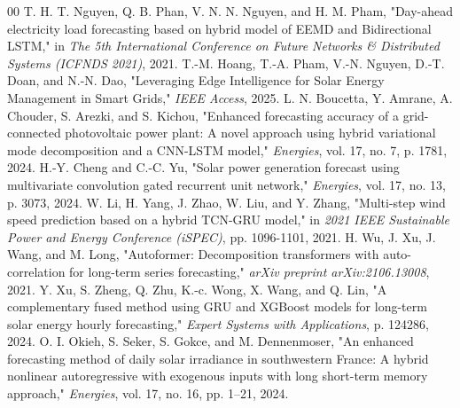 \documentclass[conference]{IEEEtran}
\begin{document}
\begin{thebibliography}{00}
 T. H. T. Nguyen, Q. B. Phan, V. N. N. Nguyen, and H. M. Pham, "Day-ahead electricity load forecasting based on hybrid model of EEMD and Bidirectional LSTM," in \textit{The 5th International Conference on Future Networks \& Distributed Systems (ICFNDS 2021)}, 2021.
 T.-M. Hoang, T.-A. Pham, V.-N. Nguyen, D.-T. Doan, and N.-N. Dao, "Leveraging Edge Intelligence for Solar Energy Management in Smart Grids," \textit{IEEE Access}, 2025.
 L. N. Boucetta, Y. Amrane, A. Chouder, S. Arezki, and S. Kichou, "Enhanced forecasting accuracy of a grid-connected photovoltaic power plant: A novel approach using hybrid variational mode decomposition and a CNN-LSTM model," \textit{Energies}, vol. 17, no. 7, p. 1781, 2024.
 H.-Y. Cheng and C.-C. Yu, "Solar power generation forecast using multivariate convolution gated recurrent unit network," \textit{Energies}, vol. 17, no. 13, p. 3073, 2024.
 W. Li, H. Yang, J. Zhao, W. Liu, and Y. Zhang, "Multi-step wind speed prediction based on a hybrid TCN-GRU model," in \textit{2021 IEEE Sustainable Power and Energy Conference (iSPEC)}, pp. 1096-1101, 2021.
 H. Wu, J. Xu, J. Wang, and M. Long, "Autoformer: Decomposition transformers with auto-correlation for long-term series forecasting," \textit{arXiv preprint arXiv:2106.13008}, 2021.
 Y. Xu, S. Zheng, Q. Zhu, K.-c. Wong, X. Wang, and Q. Lin, "A complementary fused method using GRU and XGBoost models for long-term solar energy hourly forecasting," \textit{Expert Systems with Applications}, p. 124286, 2024.
 O. I. Okieh, S. Seker, S. Gokce, and M. Dennenmoser, "An enhanced forecasting method of daily solar irradiance in southwestern France: A hybrid nonlinear autoregressive with exogenous inputs with long short-term memory approach," \textit{Energies}, vol. 17, no. 16, pp. 1–21, 2024.
\end{thebibliography}
\end{document}
